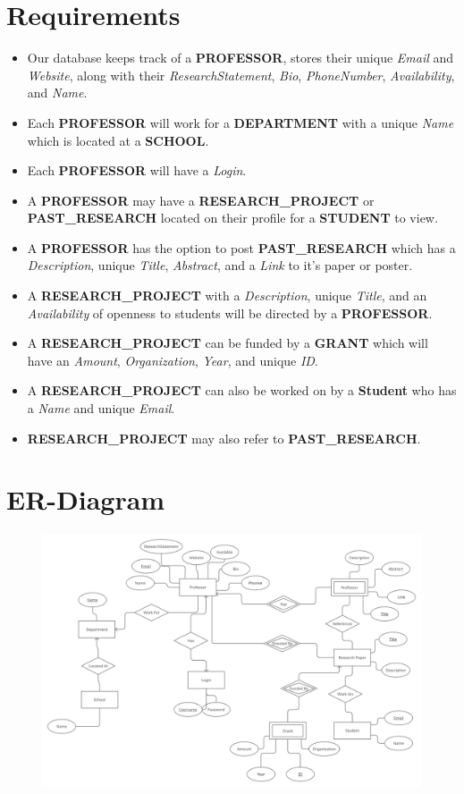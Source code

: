 \documentclass[]{spie}  %
\begin{document}
\section{Requirements}
\begin{itemize}
    \item Our database keeps track of a \textbf{PROFESSOR}, stores their unique \textit{Email} and \textit{Website}, along with their \textit{ResearchStatement}, \textit{Bio}, \textit{PhoneNumber}, \textit{Availability}, and \textit{Name}.
    \item Each \textbf{PROFESSOR} will work for a \textbf{DEPARTMENT} with a unique \textit{Name} which is located at a \textbf{SCHOOL}.
    \item Each \textbf{PROFESSOR} will have a \textit{Login}.
    \item A \textbf{PROFESSOR} may have a \textbf{RESEARCH\_PROJECT} or \textbf{PAST\_RESEARCH} located on their profile for a \textbf{STUDENT} to view. 
    \item A \textbf{PROFESSOR} has the option to post \textbf{PAST\_RESEARCH} which has a \textit{Description}, unique \textit{Title}, \textit{Abstract}, and a \textit{Link} to it's paper or poster.
    \item A \textbf{RESEARCH\_PROJECT} with a \textit{Description}, unique \textit{Title}, and an \textit{Availability} of openness to students   will be directed by a \textbf{PROFESSOR}.
    \item A \textbf{RESEARCH\_PROJECT} can be funded by a \textbf{GRANT} which will have an \textit{Amount}, \textit{Organization}, \textit{Year}, and unique \textit{ID}.
    \item A \textbf{RESEARCH\_PROJECT} can also be worked on by a \textbf{Student} who has a \textit{Name} and unique \textit{Email}.
    \item \textbf{RESEARCH\_PROJECT} may also refer to \textbf{PAST\_RESEARCH}.  
\end{itemize}
\newpage
\section{ER-Diagram}
\begin{figure}[h]
    \centering
    \includegraphics[scale = .18
    ]{ER.png}
    \label{fig:my_label}
\end{figure}
\newpage
\end{document}
